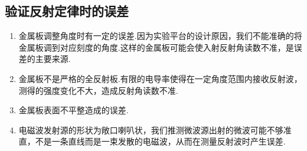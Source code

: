 \documentclass[a4paper]{article}
\begin{document}
\subsection{验证反射定律时的误差}
\begin{enumerate}
\item 金属板调整角度时有一定的误差.因为实验平台的设计原因，我们不能准确的将金属板调到对应刻度的角度.这样的金属板可能会使入射反射角读数不准，是误差的主要来源.
\item 金属板不是严格的全反射板.有限的电导率使得在一定角度范围内接收反射波，测得的强度变化不大，造成反射角读数不准.
\item 金属板表面不平整造成的误差.
\item 电磁波发射源的形状为敞口喇叭状，我们推测微波源出射的微波可能不够准直，不是一条直线而是一束发散的电磁波，从而在测量反射波时产生误差.
\end{enumerate}
\fi

\nocite{jiaocai}

\end{document}
